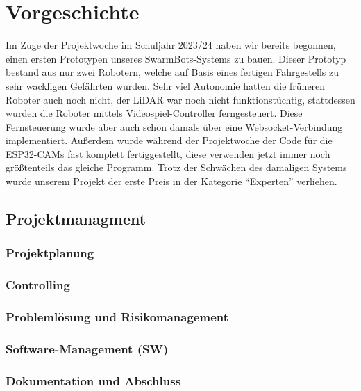 \chapter{Vorgeschichte}
\label{sec:vorgeschichte}
Im Zuge der Projektwoche im Schuljahr 2023/24 haben wir bereits begonnen,
einen ersten Prototypen unseres SwarmBots-Systems zu bauen.
%
Dieser Prototyp bestand aus nur zwei Robotern,
welche auf Basis eines fertigen Fahrgestells zu sehr wackligen Gefährten wurden.
%
Sehr viel Autonomie hatten die früheren Roboter auch noch nicht,
der LiDAR war noch nicht funktionstüchtig,
stattdessen wurden die Roboter mittels Videospiel-Controller ferngesteuert.
%
Diese Fernsteuerung wurde aber auch schon damals über eine Websocket-Verbindung implementiert.
%
Außerdem wurde während der Projektwoche der Code für die ESP32-CAMs fast komplett fertiggestellt,
diese verwenden jetzt immer noch größtenteils das gleiche Programm.
%
Trotz der Schwächen des damaligen Systems wurde unserem Projekt
der erste Preis in der Kategorie ``Experten'' verliehen.


\section{Projektmanagment}
\label{subsec:projektmanagment}
%
\subsection{Projektplanung}
%
\subsection{Controlling}
%
\subsection{Problemlösung und Risikomanagement}
%
\subsection{Software-Management (SW)}
%
\subsection{Dokumentation und Abschluss}